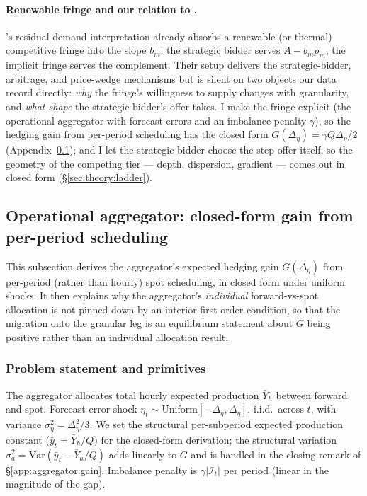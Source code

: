\documentclass[11pt,a4paper]{article}
\theoremstyle{definition}
\theoremstyle{remark}
\theoremstyle{plain}
\begin{document}
\paragraph{Renewable fringe and our relation to \citeauthor{ito_reguant_2016}.} \citeauthor{ito_reguant_2016}'s residual-demand interpretation already absorbs a renewable (or thermal) competitive fringe into the slope $b_m$: the strategic bidder serves $A - b_m p_m$, the implicit fringe serves the complement. Their setup delivers the strategic-bidder, arbitrage, and price-wedge mechanisms but is silent on two objects our data record directly: \emph{why} the fringe's willingness to supply changes with granularity, and \emph{what shape} the strategic bidder's offer takes. I make the fringe explicit (the operational aggregator with forecast errors and an imbalance penalty $\gamma$), so the hedging gain from per-period scheduling has the closed form $G(\Delta_\eta) = \gamma Q \Delta_\eta/2$ (Appendix~\ref{app:aggregator}); and I let the strategic bidder choose the step offer itself, so the geometry of the competing tier --- depth, dispersion, gradient --- comes out in closed form (\S\ref{sec:theory:ladder}).

\subsection{Operational aggregator: closed-form gain from per-period scheduling}\label{app:aggregator}

This subsection derives the aggregator's expected hedging gain $G(\Delta_\eta)$ from per-period (rather than hourly) spot scheduling, in closed form under uniform shocks. It then explains why the aggregator's \emph{individual} forward-vs-spot allocation is not pinned down by an interior first-order condition, so that the migration onto the granular leg is an equilibrium statement about $G$ being positive rather than an individual allocation result.

\subsubsection{Problem statement and primitives}\label{app:aggregator:problem}
The aggregator allocates total hourly expected production $\bar Y_h$ between forward and spot. Forecast-error shock $\eta_t \sim \mathrm{Uniform}[-\Delta_\eta, \Delta_\eta]$, i.i.d.\ across $t$, with variance $\sigma_\eta^2 = \Delta_\eta^2/3$. We set the structural per-subperiod expected production constant ($\bar y_t = \bar Y_h/Q$) for the closed-form derivation; the structural variation $\sigma_a^2 = \mathrm{Var}(\bar y_t - \bar Y_h/Q)$ adds linearly to $G$ and is handled in the closing remark of \S\ref{app:aggregator:gain}. Imbalance penalty is $\gamma|\mathcal{I}_t|$ per period (linear in the magnitude of the gap).
\end{document}
